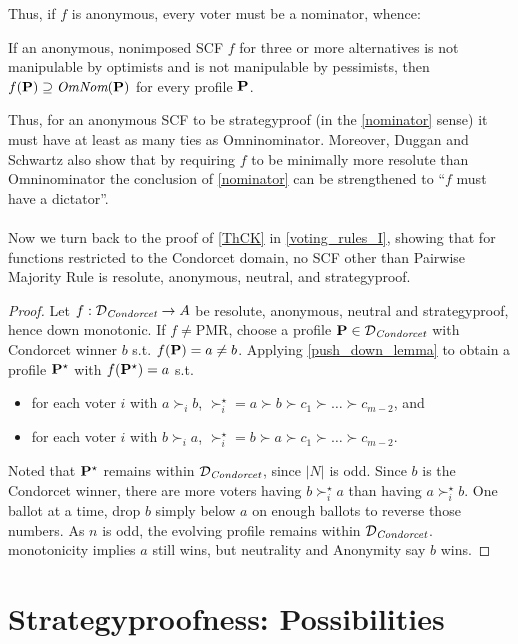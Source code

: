 Thus, if $f$ is anonymous, every voter must be a nominator, whence:

\begin{corollary}
    If an anonymous, nonimposed SCF $f$ for three or more alternatives is not manipulable by optimists and is not manipulable by pessimists, then $f (\mathbf{P}) \supseteq \textit{OmNom}(\mathbf{P})$ for every profile $\mathbf{P}$.
\end{corollary}

Thus, for an anonymous SCF to be strategyproof (in the \cref{nominator} sense) it must have at least as many ties as Omninominator. Moreover, Duggan and Schwartz also show that by requiring $f$ to be minimally more resolute than Omninominator the conclusion of \cref{nominator} can be strengthened to ``$f$ must have a dictator''.\\
~\\
Now we turn back to the proof of \cref{ThCK} in \cref{voting_rules_I}, showing that for functions restricted to the Condorcet domain, no SCF other than Pairwise Majority Rule is resolute, anonymous, neutral, and strategyproof.

\begin{proof}
    \label{second_part_ThCK}
    Let $f: \mathcal{D}_\textit{Condorcet} \to A$ be resolute, anonymous, neutral and strategyproof, hence down monotonic. If $f \neq \mbox{PMR}$, choose a profile $\mathbf{P} \in \mathcal{D}_\textit{Condorcet}$ with Condorcet winner $b$ s.t. $f(\mathbf{P}) = a \neq b$. Applying \cref{push_down_lemma} to obtain a profile $\mathbf{P}^\star$ with $f(\mathbf{P}^\star) = a$ s.t. 
    \begin{itemize}
        \item for each voter $i$ with $a \succ_i b$, $\succ^\star_i = a \succ b \succ c_1 \succ \dots \succ c_{m-2}$, and
        \item for each voter $i$ with $b \succ_i a$, $\succ^\star_i = b \succ a \succ c_1 \succ \dots \succ c_{m-2}$.
    \end{itemize}
    Noted that $\mathbf{P}^\star$ remains within $\mathcal{D}_\textit{Condorcet}$, since $|N|$ is odd. Since $b$ is the Condorcet winner, there are more voters having $b \succ^\star_i a$ than having $a \succ^\star_i b$. One ballot at a time, drop $b$ simply below $a$ on enough ballots to reverse those numbers. As $n$ is odd, the evolving profile remains within $\mathcal{D}_\textit{Condorcet}$. monotonicity implies $a$ still wins, but neutrality and Anonymity say $b$ wins.
\end{proof}

\section{Strategyproofness: Possibilities}

